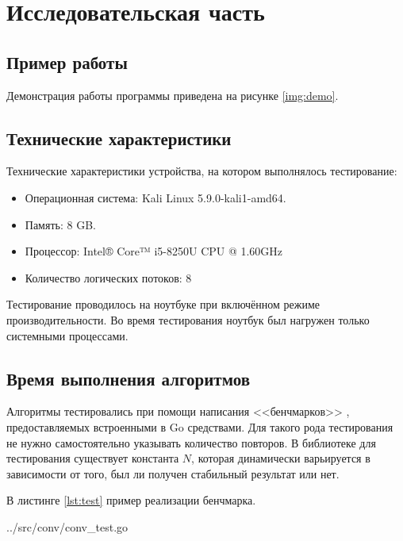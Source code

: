 \chapter{Исследовательская часть}

\section{Пример работы}

Демонстрация работы программы приведена на рисунке \ref{img:demo}.


\section{Технические характеристики}

Технические характеристики устройства, на котором выполнялось тестирование:

\begin{itemize}
	\item Операционная система: Kali \cite{kali} Linux \cite{linux} 5.9.0-kali1-amd64.
	\item Память: 8 GB.
	\item Процессор: Intel® Core™ i5-8250U \cite{intel} CPU @ 1.60GHz
	\item Количество логических потоков: 8
\end{itemize}

Тестирование проводилось на ноутбуке при включённом режиме производительности. Во время тестирования ноутбук был нагружен только системными процессами.


\section{Время выполнения алгоритмов}

Алгоритмы тестировались при помощи написания <<бенчмарков>> \cite{gotest}, предоставляемых встроенными в Go средствами. Для такого рода тестирования не нужно самостоятельно указывать количество повторов. В библиотеке для тестирования существует константа $N$, которая динамически варьируется в зависимости от того, был ли получен стабильный результат или нет.

В листинге \ref{lst:test} пример реализации бенчмарка.

\begin{lstinputlisting}[
	caption={Реализация бенчмарка},
	label={lst:test},
	style={go},
	linerange={5-11},
	]{../src/conv/conv_test.go}
\end{lstinputlisting}

